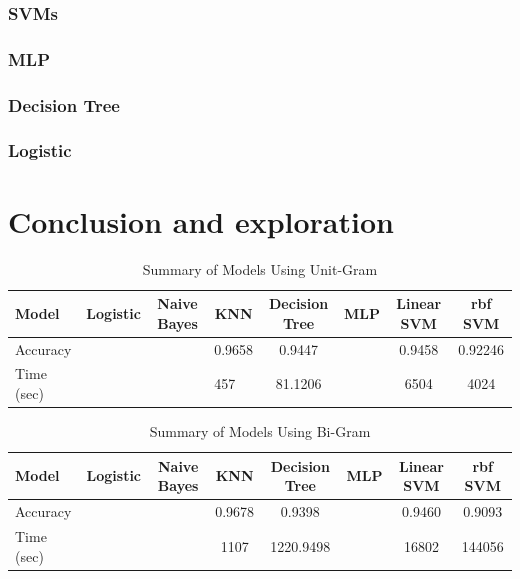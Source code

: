 \documentclass[12pt]{article}
\begin{document}
\subsubsection{SVMs}

\subsubsection{MLP}
\subsubsection{Decision Tree}

\subsubsection{Logistic}


\section{Conclusion and exploration}


\begin{table}[H]
	\centering
	\caption{Summary of Models Using Unit-Gram}
	\label{Summary-one-gram}
	\begin{tabular}{lccccccc}
		\hline
		Model      & Logistic             & Naive Bayes          & KNN                     & Decision Tree & MLP                  & Linear SVM & rbf SVM \\ \hline
		Accuracy   &                      &                      & 0.9658                  & 0.9447        &                      & 0.9458     & 0.92246 \\
		Time (sec) & \multicolumn{1}{l}{} & \multicolumn{1}{l}{} & \multicolumn{1}{l}{457} & 81.1206       & \multicolumn{1}{l}{} & 6504       & 4024    \\ \hline
	\end{tabular}
\end{table}


\begin{table}[H]
	\centering
	\caption{Summary of Models Using Bi-Gram}
	\label{Summary-bi-gram}
	\begin{tabular}{lccccccc}
		\hline
		Model      & Logistic & Naive Bayes & KNN    & Decision Tree & MLP & Linear SVM & rbf SVM \\ \hline
		Accuracy   &          &             & 0.9678 & 0.9398        &     & 0.9460     & 0.9093  \\
		Time (sec) &          &             & 1107   & 1220.9498     &     & 16802      & 144056  \\ \hline
	\end{tabular}
\end{table}
\end{document}
